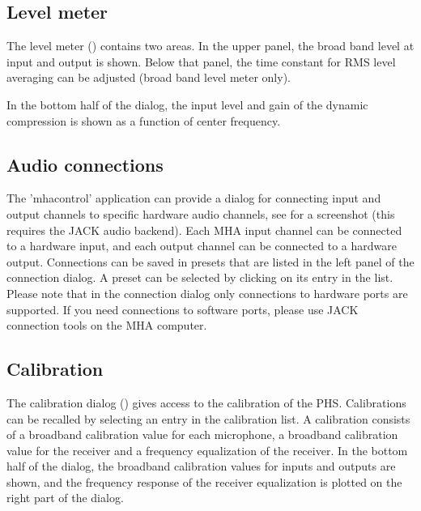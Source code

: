 \documentclass[11pt,a4paper,twoside]{article}
\newcommand{\+}{\discretionary{\mbox{\scriptsize$\hookleftarrow$}}{}{}}
\begin{document}
\subsection{Level meter}\label{sec:levels}

The level meter () contains two areas.
%
In the upper panel, the broad band level at input and output is shown.
%
Below that panel, the time constant for RMS level averaging can be
adjusted (broad band level meter only).

In the bottom half of the dialog, the input level and gain of the
dynamic compression is shown as a function of center frequency.


\subsection{Audio connections}\label{sec:audioconnections}

The 'mhacontrol' application can provide a dialog for connecting input
and output channels to specific hardware audio channels, see
 for a screenshot (this
requires the JACK audio backend).
%
Each MHA input channel can be connected to a hardware input, and
each output channel can be connected to a hardware output.
%
Connections can be saved in presets that are listed in the left panel of the connection dialog.
%
A preset can be selected by clicking on its entry in the list.
%
Please note that in the connection dialog only connections to hardware
ports are supported.
%
If you need connections to software ports, please use JACK connection
tools on the MHA computer.
%


\subsection{Calibration}\label{sec:calibration}

The calibration dialog () gives access
to the calibration of the PHS.
%
Calibrations can be recalled by selecting an entry in the calibration
list.
%
A calibration consists of a broadband calibration value for each
microphone, a broadband calibration value for the receiver and a
frequency equalization of the receiver.
%
In the bottom half of the dialog, the broadband calibration values for
inputs and outputs are shown, and the frequency response of the
receiver equalization is plotted on the right part of the dialog.
\end{document}
